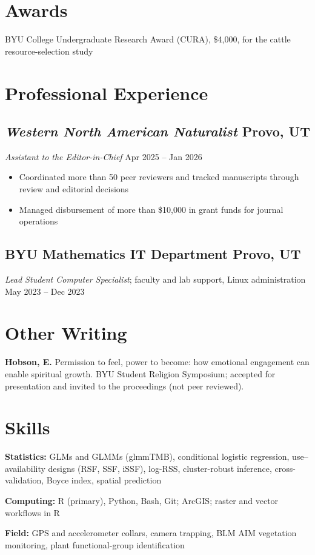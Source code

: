 \documentclass[11pt]{article}
\begin{document}
\section*{Awards}
BYU College Undergraduate Research Award (CURA), \$4,000, for the cattle resource-selection study

\section*{Professional Experience}

\subsection*{\textit{Western North American Naturalist} \hfill Provo, UT}
\textit{Assistant to the Editor-in-Chief} \hfill Apr 2025 -- Jan 2026
\begin{itemize}
\item Coordinated more than 50 peer reviewers and tracked manuscripts through review and
  editorial decisions
\item Managed disbursement of more than \$10,000 in grant funds for journal operations
\end{itemize}

\subsection*{BYU Mathematics IT Department \hfill Provo, UT}
\textit{Lead Student Computer Specialist}; faculty and lab support, Linux administration \hfill May 2023 -- Dec 2023

\section*{Other Writing}
\textbf{Hobson, E.} Permission to feel, power to become: how emotional engagement can enable
spiritual growth. BYU Student Religion Symposium; accepted for presentation and invited to the
proceedings (not peer reviewed).

\section*{Skills}

\textbf{Statistics:}
GLMs and GLMMs (glmmTMB), conditional logistic regression, use--availability designs (RSF, SSF,
iSSF), log-RSS, cluster-robust inference, cross-validation, Boyce index, spatial prediction

\vspace{0.1em}
\textbf{Computing:}
R (primary), Python, Bash, Git; ArcGIS; raster and vector workflows in R

\vspace{0.1em}
\textbf{Field:}
GPS and accelerometer collars, camera trapping, BLM AIM vegetation monitoring, plant
functional-group identification
\end{document}
